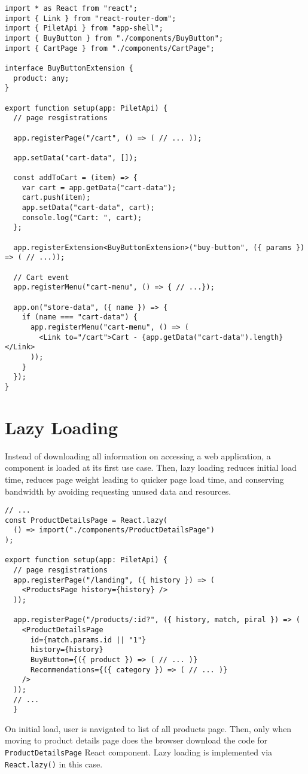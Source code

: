 \documentclass[a4paper]{book}
\begin{document}
\begin{lstlisting}[caption={pilet-carts handles cart data}]
import * as React from "react";
import { Link } from "react-router-dom";
import { PiletApi } from "app-shell";
import { BuyButton } from "./components/BuyButton";
import { CartPage } from "./components/CartPage";

interface BuyButtonExtension {
  product: any;
}

export function setup(app: PiletApi) {
  // page resgistrations

  app.registerPage("/cart", () => ( // ... ));

  app.setData("cart-data", []);

  const addToCart = (item) => {
    var cart = app.getData("cart-data");
    cart.push(item);
    app.setData("cart-data", cart);
    console.log("Cart: ", cart);
  };

  app.registerExtension<BuyButtonExtension>("buy-button", ({ params }) => ( // ...));

  // Cart event
  app.registerMenu("cart-menu", () => { // ...});

  app.on("store-data", ({ name }) => {
    if (name === "cart-data") {
      app.registerMenu("cart-menu", () => (
        <Link to="/cart">Cart - {app.getData("cart-data").length} </Link>
      ));
    }
  });
}

\end{lstlisting}


\section{Lazy Loading}
Instead of downloading all information on accessing a web application, a component is loaded at its first use case. Then, lazy loading reduces initial load time, reduces page weight leading to quicker page load time, and conserving bandwidth by avoiding requesting unused data and resources.
\begin{lstlisting}[caption={Lazy loading of a React component in pilet-products index.tsx file}]
  // ...
const ProductDetailsPage = React.lazy(
  () => import("./components/ProductDetailsPage")
);

export function setup(app: PiletApi) {
  // page resgistrations
  app.registerPage("/landing", ({ history }) => ( 
    <ProductsPage history={history} />
  ));

  app.registerPage("/products/:id?", ({ history, match, piral }) => (
    <ProductDetailsPage
      id={match.params.id || "1"}
      history={history}
      BuyButton={({ product }) => ( // ... )}
      Recommendations={({ category }) => ( // ... )}
    />
  ));
  // ...
  }
\end{lstlisting}
On initial load, user is navigated to list of all products page. Then, only when moving to product details page does the browser download the code for \verb|ProductDetailsPage| React component. Lazy loading is implemented via \verb|React.lazy()| in this case.
\end{document}
